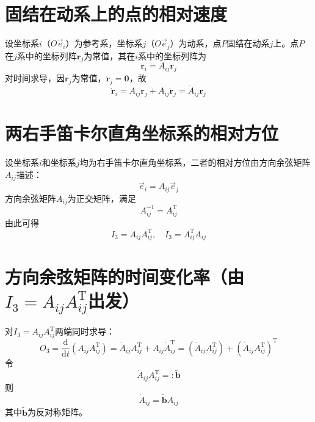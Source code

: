 \section{固结在动系上的点的相对速度}

设坐标系$i$（$O\vec{e}_i$）为参考系，坐标系$j$（$O\vec{e}_j$）为动系，点$P$固结在动系$j$上。点$P$在$j$系中的坐标列阵$\boldsymbol{r}_j$为常值，其在$i$系中的坐标列阵为
\begin{equation}
\boldsymbol{r}_i = A_{ij}\boldsymbol{r}_j
\end{equation}
对时间求导，因$\boldsymbol{r}_j$为常值，$\dot{\boldsymbol{r}}_j = \boldsymbol{0}$，故
\begin{equation}
\dot{\boldsymbol{r}}_i = \dot{A}_{ij}\boldsymbol{r}_j + A_{ij}\dot{\boldsymbol{r}}_j = \dot{A}_{ij}\boldsymbol{r}_j
\end{equation}

\section{两右手笛卡尔直角坐标系的相对方位}

设坐标系$i$和坐标系$j$均为右手笛卡尔直角坐标系，二者的相对方位由方向余弦矩阵$A_{ij}$描述：
\begin{equation}
\vec{e}_i = A_{ij}\vec{e}_j
\end{equation}
方向余弦矩阵$A_{ij}$为正交矩阵，满足
\begin{equation}
A_{ij}^{-1} = A_{ij}^{\mathrm{T}}
\end{equation}
由此可得
\begin{equation}
I_3 = A_{ij}A_{ij}^{\mathrm{T}}, \quad I_3 = A_{ij}^{\mathrm{T}}A_{ij}
\label{eq:6.1}
\end{equation}

\section{方向余弦矩阵的时间变化率（由$I_3 = A_{ij}A_{ij}^{\mathrm{T}}$出发）}

对$I_3 = A_{ij}A_{ij}^{\mathrm{T}}$两端同时求导：
\begin{equation}
O_3 = \frac{\mathrm{d}}{\mathrm{d}t}\left(A_{ij}A_{ij}^{\mathrm{T}}\right) = \dot{A}_{ij}A_{ij}^{\mathrm{T}} + A_{ij}\dot{A}_{ij}^{\mathrm{T}}
= \left(\dot{A}_{ij}A_{ij}^{\mathrm{T}}\right) + \left(\dot{A}_{ij}A_{ij}^{\mathrm{T}}\right)^{\mathrm{T}}
\end{equation}
令
\begin{equation}
\dot{A}_{ij}A_{ij}^{\mathrm{T}} =: \tilde{\boldsymbol{b}}
\end{equation}
则
\begin{equation}
\dot{A}_{ij} = \tilde{\boldsymbol{b}}A_{ij}
\end{equation}
其中$\tilde{\boldsymbol{b}}$为反对称矩阵。


